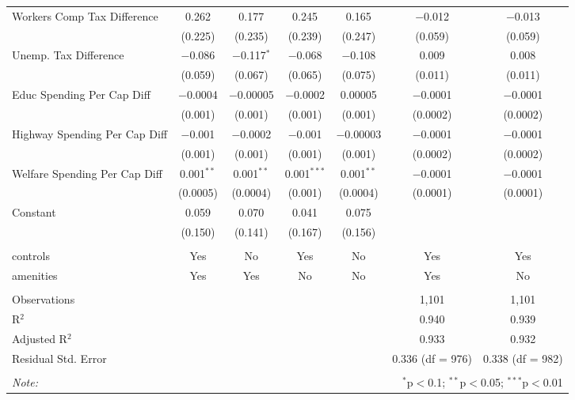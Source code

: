 \begin{table}[!htbp]
\begin{tabular}{@{\extracolsep{5pt}}lcccccc}
  Workers Comp Tax Difference & 0.262 & 0.177 & 0.245 & 0.165 & $-$0.012 & $-$0.013 \\ 
  & (0.225) & (0.235) & (0.239) & (0.247) & (0.059) & (0.059) \\ 
  Unemp. Tax Difference & $-$0.086 & $-$0.117$^{*}$ & $-$0.068 & $-$0.108 & 0.009 & 0.008 \\ 
  & (0.059) & (0.067) & (0.065) & (0.075) & (0.011) & (0.011) \\ 
  Educ Spending Per Cap Diff & $-$0.0004 & $-$0.00005 & $-$0.0002 & 0.00005 & $-$0.0001 & $-$0.0001 \\ 
  & (0.001) & (0.001) & (0.001) & (0.001) & (0.0002) & (0.0002) \\ 
  Highway Spending Per Cap Diff & $-$0.001 & $-$0.0002 & $-$0.001 & $-$0.00003 & $-$0.0001 & $-$0.0001 \\ 
  & (0.001) & (0.001) & (0.001) & (0.001) & (0.0002) & (0.0002) \\ 
  Welfare Spending Per Cap Diff & 0.001$^{**}$ & 0.001$^{**}$ & 0.001$^{***}$ & 0.001$^{**}$ & $-$0.0001 & $-$0.0001 \\ 
  & (0.0005) & (0.0004) & (0.001) & (0.0004) & (0.0001) & (0.0001) \\ 
  Constant & 0.059 & 0.070 & 0.041 & 0.075 &  &  \\ 
  & (0.150) & (0.141) & (0.167) & (0.156) &  &  \\ 
 \hline \\[-1.8ex] 
controls & Yes & No & Yes & No & Yes & Yes \\ 
amenities & Yes & Yes & No & No & Yes & No \\ 
\hline \\[-1.8ex] 
Observations &  &  &  &  & 1,101 & 1,101 \\ 
R$^{2}$ &  &  &  &  & 0.940 & 0.939 \\ 
Adjusted R$^{2}$ &  &  &  &  & 0.933 & 0.932 \\ 
Residual Std. Error &  &  &  &  & 0.336 (df = 976) & 0.338 (df = 982) \\ 
\hline 
\hline \\[-1.8ex] 
\textit{Note:}  & \multicolumn{6}{r}{$^{*}$p$<$0.1; $^{**}$p$<$0.05; $^{***}$p$<$0.01} \\ 
\end{tabular} 
\end{table} 
